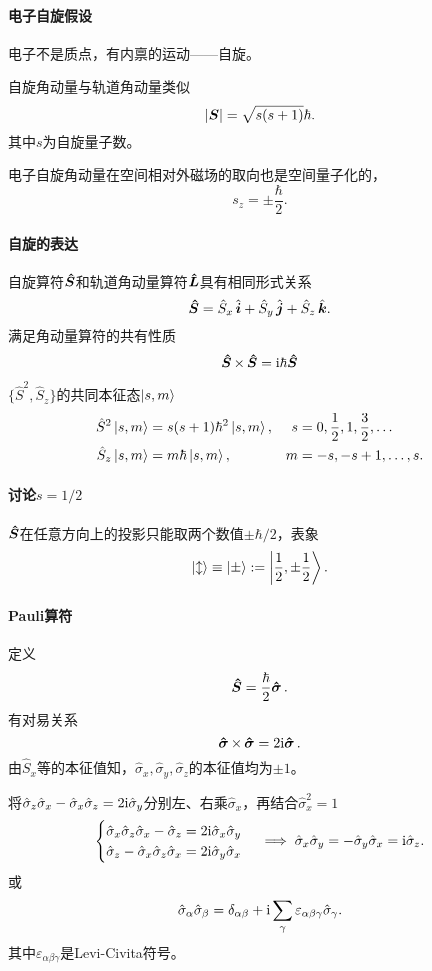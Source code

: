 \paragraph{电子自旋假设}
\begin{compactenum}
	\item 电子不是质点，有内禀的运动——自旋。%
	\item 自旋角动量与轨道角动量类似
		\[
		\left\lvert\bm S\right\rvert=\sqrt{s(s+1)}\hbar.
\]
		其中$s$为自旋量子数。
	\item 电子自旋角动量在空间相对外磁场的取向也是空间量子化的，
		\[
s_z=\pm\frac{\hbar}2.
\]
\end{compactenum}
\paragraph{自旋的表达}自旋算符$\bm{\hat S}\!\mathop{}$和轨道角动量算符$\bm{\hat L}\!\mathop{}$具有相同形式关系
\[
	\bm{\hat S}\!\mathop{}=\hat S_x\mathop{}\!\hat{\bm{i}}+\hat S_y\mathop{}\!\hat{\bm{j}}+\hat S_z\mathop{}\!\hat{\bm{k}}.
\]
满足角动量算符的共有性质
\begin{gather}
	\qo S\times\,\qo S=\i\hbar\qo S %
\end{gather}
$\{\hat S^2,\hat S_z\}$的共同本征态$\left\vert s,m\right\rangle$
\begin{align}
	\hat S^2\left\vert s,m\right\rangle&=s(s+1)\hbar^2\left\vert s,m\right\rangle,&s&=0,\frac12,1,\frac32,\ldots\\
	\hat S_z\left\vert s,m\right\rangle&=m\hbar\left\vert s,m\right\rangle,&m&=-s,-s+1,\ldots,s.
\end{align}
\paragraph{讨论$s=1/2$}$\bm{\hat S}\!\mathop{}$在任意方向上的投影只能取两个数值$\pm\hbar/2$，表象 
\[
	\left\vert \updownarrow\right\rangle\equiv\left\vert \pm\right\rangle:=\left\vert \frac12,\pm\frac12\right\rangle.
\]
\paragraph{Pauli算符}定义 
\[
	\bm{\hat S}\!\mathop{}=\frac\hbar{2}\bm{\hat \sigma}\!\mathop{}.
\]
有对易关系
\[
	\bm{\hat \sigma}\!\mathop{}\times\,\bm{\hat \sigma}\!\mathop{}=2\mathrm{i}\bm{\hat \sigma}\!\mathop{}.
\]
由$\hat S_x$等的本征值知，$\hat\sigma_x,\hat\sigma_y,\hat\sigma_z$的本征值均为$\pm 1$。

将$\hat\sigma_z\hat\sigma_x-\hat\sigma_x\hat\sigma_z=2\mathrm{i}\hat\sigma_y$分别左、右乘$\hat\sigma_x$，再结合$\hat\sigma_x^2=1$
\begin{align}
	\begin{cases}
		\hat\sigma_x\hat\sigma_z\hat\sigma_x-\hat\sigma_z=2\mathrm{i}\hat\sigma_x\hat\sigma_y\\
		\hat\sigma_z-\hat\sigma_x\hat\sigma_z\hat\sigma_x=2\mathrm{i}\hat\sigma_y\hat\sigma_x
	\end{cases}\implies\hat\sigma_x\hat\sigma_y=-\hat\sigma_y\hat\sigma_x=\mathrm{i}\hat\sigma_z.
\end{align}
或
\begin{align}
	\hat\sigma_\alpha\hat\sigma_\beta=\delta_{\alpha\beta}+\mathrm{i}\sum_\gamma\varepsilon_{\alpha\beta\gamma}\hat\sigma_\gamma.
\end{align}
其中$\varepsilon_{\alpha\beta\gamma}$是Levi-Civita符号。
